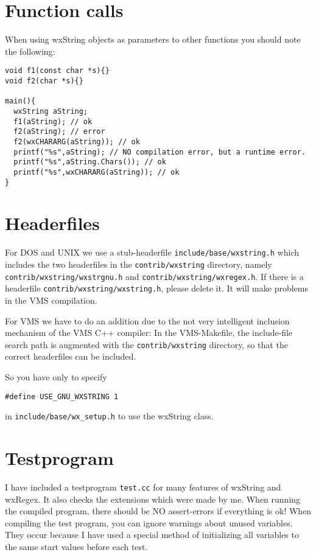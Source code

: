   



\section{Function calls}
%
\setfooter{\thepage}{}{}{}{}{\thepage}

When using wxString objects as parameters to other functions you should
note the following:

\begin{verbatim}
void f1(const char *s){}
void f2(char *s){}

main(){
  wxString aString;
  f1(aString); // ok
  f2(aString); // error
  f2(wxCHARARG(aString)); // ok
  printf("%s",aString); // NO compilation error, but a runtime error.
  printf("%s",aString.Chars()); // ok
  printf("%s",wxCHARARG(aString)); // ok
}
\end{verbatim}

  


\section{Headerfiles}
%
\setfooter{\thepage}{}{}{}{}{\thepage}

For DOS and UNIX we use a stub-headerfile {\tt include/base/wxstring.h} 
which includes the two headerfiles in the {\tt contrib/wxstring} directory,
namely {\tt contrib/wxstring/wxstrgnu.h} and {\tt contrib/wxstring/wxregex.h}.
If there is a headerfile {\tt contrib/wxstring/wxstring.h}, please
delete it. It will make problems in the VMS compilation.

For VMS we have to do an addition due to the not very intelligent inclusion mechanism
of the VMS C++ compiler:
In the VMS-Makefile, the include-file search path is augmented with the 
{\tt contrib/wxstring} directory, so that the correct headerfiles 
can be included.

So you have only to specify
\begin{verbatim}
#define USE_GNU_WXSTRING 1
\end{verbatim}
in {\tt include/base/wx_setup.h} to use the wxString class.


\section{Testprogram}
%
\setfooter{\thepage}{}{}{}{}{\thepage}
I have included a testprogram {\tt test.cc} for many features
of wxString and wxRegex. It also checks the extensions which
were made by me. When running the compiled program, there should
be NO assert-errors if everything is ok! When compiling the test
program, you can ignore warnings about unused variables. They
occur because I have used a special method of initializing all
variables to the same start values before each test.



